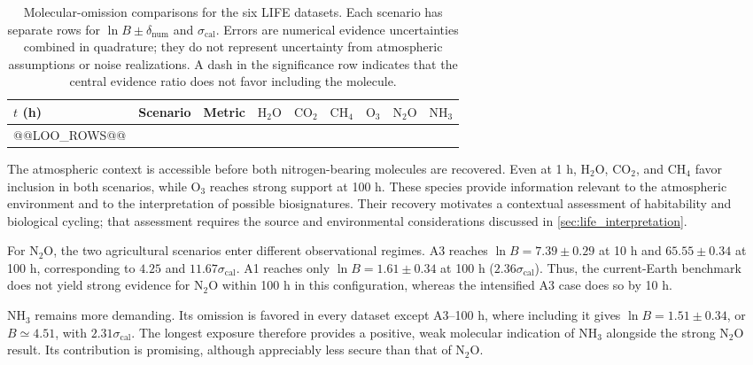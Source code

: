 \begin{table}[t!]
\centering
\caption{Molecular-omission comparisons for the six LIFE datasets. Each scenario has separate rows for $\ln B\pm\delta_{\mathrm{num}}$ and $\sigma_{\mathrm{cal}}$. Errors are numerical evidence uncertainties combined in quadrature; they do not represent uncertainty from atmospheric assumptions or noise realizations. A dash in the significance row indicates that the central evidence ratio does not favor including the molecule.}
\label{tab:life_molecular_evidence}
\begingroup
\scriptsize
\setlength{\tabcolsep}{3pt}
\begin{tabular}{llcrrrrrr}
\hline
$t$ (h) & Scenario & Metric & $\mathrm{H_2O}$ & $\mathrm{CO_2}$ & $\mathrm{CH_4}$ & $\mathrm{O_3}$ & $\mathrm{N_2O}$ & $\mathrm{NH_3}$ \\
\hline
@@LOO_ROWS@@
\hline
\end{tabular}
\endgroup
\end{table}

The atmospheric context is accessible before both nitrogen-bearing molecules are recovered. Even at 1 h, $\mathrm{H_2O}$, $\mathrm{CO_2}$, and $\mathrm{CH_4}$ favor inclusion in both scenarios, while $\mathrm{O_3}$ reaches strong support at 100 h. These species provide information relevant to the atmospheric environment and to the interpretation of possible biosignatures. Their recovery motivates a contextual assessment of habitability and biological cycling; that assessment requires the source and environmental considerations discussed in \autoref{sec:life_interpretation}.

For $\mathrm{N_2O}$, the two agricultural scenarios enter different observational regimes. A3 reaches $\ln B=7.39\pm0.29$ at 10 h and $65.55\pm0.34$ at 100 h, corresponding to $4.25$ and $11.67\sigma_{\mathrm{cal}}$. A1 reaches only $\ln B=1.61\pm0.34$ at 100 h ($2.36\sigma_{\mathrm{cal}}$). Thus, the current-Earth benchmark does not yield strong evidence for $\mathrm{N_2O}$ within 100 h in this configuration, whereas the intensified A3 case does so by 10 h.

$\mathrm{NH_3}$ remains more demanding. Its omission is favored in every dataset except A3--100 h, where including it gives $\ln B=1.51\pm0.34$, or $B\simeq4.51$, with $2.31\sigma_{\mathrm{cal}}$. The longest exposure therefore provides a positive, weak molecular indication of $\mathrm{NH_3}$ alongside the strong $\mathrm{N_2O}$ result. Its contribution is promising, although appreciably less secure than that of $\mathrm{N_2O}$.

